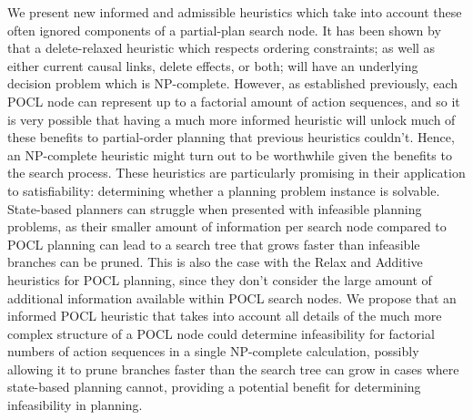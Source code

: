 We present new informed and admissible heuristics which take into account these often ignored components of a partial-plan search node. It has been shown by~\cite{Bercher2021POCLComplexities} that a delete-relaxed heuristic which respects ordering constraints; as well as either current causal links, delete effects, or both; will have an underlying decision problem which is NP-complete. However, as established previously, each POCL node can represent up to a factorial amount of action sequences, and so it is very possible that having a much more informed heuristic will unlock much of these benefits to partial-order planning that previous heuristics couldn't. Hence, an NP-complete heuristic might turn out to be worthwhile given the benefits to the search process. These heuristics are particularly promising in their application to satisfiability: determining whether a planning problem instance is solvable. State-based planners can struggle when presented with infeasible planning problems, as their smaller amount of information per search node compared to POCL planning can lead to a search tree that grows faster than infeasible branches can be pruned. This is also the case with the Relax and Additive heuristics for POCL planning, since they don't consider the large amount of additional information available within POCL search nodes. We propose that an informed POCL heuristic that takes into account all details of the much more complex structure of a POCL node could determine infeasibility for factorial numbers of action sequences in a single NP-complete calculation, possibly allowing it to prune branches faster than the search tree can grow in cases where state-based planning cannot, providing a potential benefit for determining infeasibility in planning.